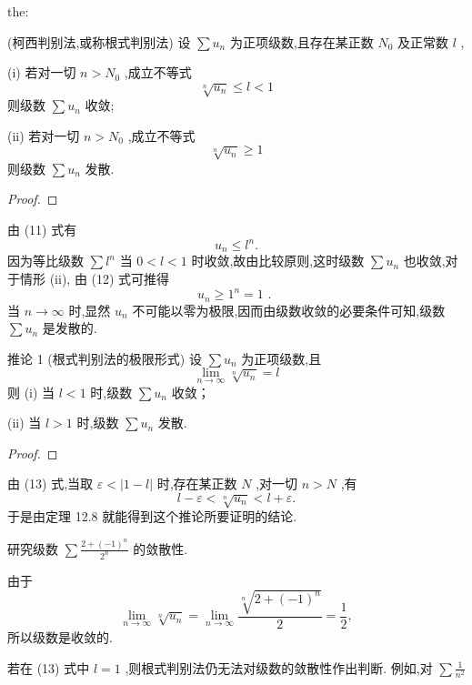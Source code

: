 \begin{theorem}{}{the:}

\end{theorem}
 (柯西判别法,或称根式判别法) 设 \(\sum {u}_{n}\) 为正项级数,且存在某正数 \({N}_{0}\) 及正常数 \(l\) ,

(i) 若对一切 \(n > {N}_{0}\) ,成立不等式
\[
\sqrt[n]{{u}_{n}} \leq  l < 1 \tag{11}
\]
则级数 \(\sum {u}_{n}\) 收敛;

(ii) 若对一切 \(n > {N}_{0}\) ,成立不等式
\[
\sqrt[n]{{u}_{n}} \geq  1 \tag{12}
\]
则级数 \(\sum {u}_{n}\) 发散.

\begin{proof}

\end{proof}
由 (11) 式有
\[
{u}_{n} \leq  {l}^{n}.
\]
因为等比级数 \(\sum {l}^{n}\) 当 \(0 < l < 1\) 时收敛,故由比较原则,这时级数 \(\sum {u}_{n}\) 也收敛,对于情形 (ii), 由 (12) 式可推得
\[
{u}_{n} \geq  {1}^{n} = 1\text{ . }
\]
当 \(n \rightarrow  \infty\) 时,显然 \({u}_{n}\) 不可能以零为极限,因而由级数收敛的必要条件可知,级数 \(\sum {u}_{n}\) 是发散的.

推论 1 (根式判别法的极限形式) 设 \(\sum {u}_{n}\) 为正项级数,且
\[
\mathop{\lim }\limits_{{n \rightarrow  \infty }}\sqrt[n]{{u}_{n}} = l \tag{13}
\]
则 (i) 当 \(l < 1\) 时,级数 \(\sum {u}_{n}\) 收敛；

(ii) 当 \(l > 1\) 时,级数 \(\sum {u}_{n}\) 发散.

\begin{proof}

\end{proof}
由 (13) 式,当取 \(\varepsilon  < \left| {1 - l}\right|\) 时,存在某正数 \(N\) ,对一切 \(n > N\) ,有
\[
l - \varepsilon  < \sqrt[n]{{u}_{n}} < l + \varepsilon .
\]
于是由定理 12.8 就能得到这个推论所要证明的结论.

\begin{example}

\end{example}
研究级数 \(\sum \frac{2 + {\left( -1\right) }^{n}}{{2}^{n}}\) 的敛散性.

\begin{solution}

\end{solution}
由于
\[
\mathop{\lim }\limits_{{n \rightarrow  \infty }}\sqrt[n]{{u}_{n}} = \mathop{\lim }\limits_{{n \rightarrow  \infty }}\frac{\sqrt[n]{2 + {\left( -1\right) }^{n}}}{2} = \frac{1}{2},
\]
所以级数是收敛的.

若在 (13) 式中 \(l = 1\) ,则根式判别法仍无法对级数的敛散性作出判断. 例如,对 \(\sum \frac{1}{{n}^{2}}\)

